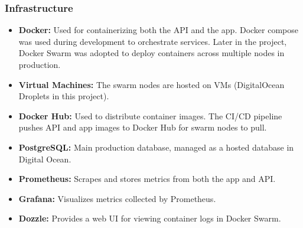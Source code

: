 \subsubsection{Infrastructure}
\begin{itemize}
    \item \textbf{Docker:} Used for containerizing both the API and the app. Docker compose was used during development to orchestrate services. Later in the project, Docker Swarm was adopted to deploy containers across multiple nodes in production.
    \item \textbf{Virtual Machines:} The swarm nodes are hosted on VMs (DigitalOcean Droplets in this project).
    \item \textbf{Docker Hub:} Used to distribute container images. The CI/CD pipeline pushes API and app images to Docker Hub for swarm nodes to pull.
    \item \textbf{PostgreSQL:} Main production database, managed as a hosted database in Digital Ocean.
    \item \textbf{Prometheus:} Scrapes and stores metrics from both the app and API.
    \item \textbf{Grafana:} Visualizes metrics collected by Prometheus.
    \item \textbf{Dozzle:} Provides a web UI for viewing container logs in Docker Swarm.
\end{itemize}